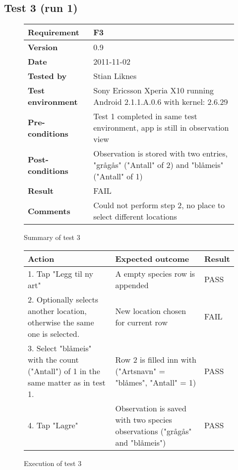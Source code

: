 \newpage
\subsection*{Test 3 (run 1)}

	\begin{figure}[htb]
		\centering
		\begin{tabular}{|p{3.5cm}|p{7.0cm}|} \hline
			\textbf{Requirement} & F3 \\ \hline
			\textbf{Version} & 0.9 \\ \hline
			\textbf{Date} & 2011-11-02 \\ \hline
			\textbf{Tested by} & Stian Liknes \\ \hline
			\textbf{Test environment} & Sony Ericsson Xperia X10 running Android 2.1.1.A.0.6 with kernel: 2.6.29 \\ \hline
			\textbf{Pre-conditions} & Test 1 completed in same test environment, app is still in observation view \\ \hline
			\textbf{Post-conditions} & Observation is stored with two entries, "grågås" ("Antall" of 2) and "blåmeis" ("Antall" of 1) \\ \hline
			\textbf{Result} & FAIL \\ \hline
			\textbf{Comments} & Could not perform step 2, no place to select different locations \\ \hline
		\end{tabular}
		\caption{Summary of test 3}
	\end{figure}

	\begin{figure}[htb]
		\centering
		\begin{tabular}{|p{5.0cm}|p{5.0cm}|p{1cm}|}
			\hline \textbf{Action} & \textbf{Expected outcome} & \textbf{Result} \\ \hline

			1. Tap "Legg til ny art" &
			A empty species row is appended &
			PASS \\ \hline
			
			2. Optionally selects another location, otherwise the same one is
			selected. & 
			New location chosen for current row &
			FAIL \\ \hline

			3. Select "blåmeis" with the count ("Antall") of 1 in the same matter 
			as in test 1. &
			Row 2 is filled inn with ("Artsnavn" = "blåmes", "Antall" = 1) &
			PASS \\ \hline

			4. Tap "Lagre" &
			Observation is saved with two species observations ("grågås" and "blåmeis") &
			PASS \\ \hline
		\end{tabular}
		\caption{Execution of test 3}
	\end{figure}

